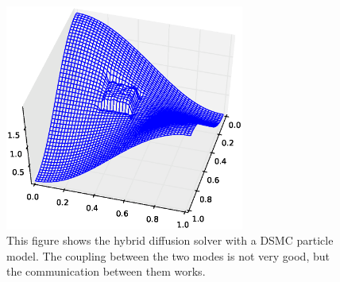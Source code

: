 \begin{figure}[H]
 \centering
 \includegraphics[width=0.7\textwidth]{Figures/anders_stuff.eps}
 \caption[Hybrid solver with DSMC particle model]{This figure shows the hybrid diffusion solver with a DSMC particle model. The coupling between the two modes is not very good, but the communication between them works.}
 \label{results:anders}
\end{figure}
